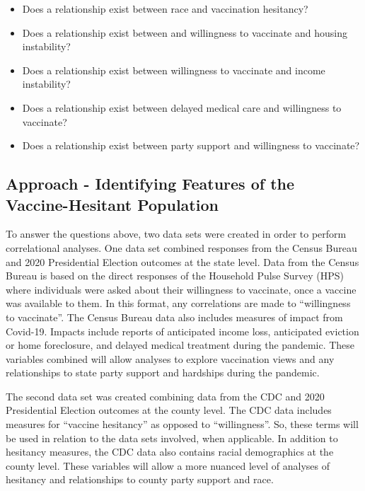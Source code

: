 \documentclass[
]{article}
\providecommand{\tightlist}{%
  \setlength{\itemsep}{0pt}\setlength{\parskip}{0pt}}
\begin{document}
\begin{itemize}
\tightlist
\item
  Does a relationship exist between race and vaccination hesitancy?
\item
  Does a relationship exist between and willingness to vaccinate and
  housing instability?
\item
  Does a relationship exist between willingness to vaccinate and income
  instability?
\item
  Does a relationship exist between delayed medical care and willingness
  to vaccinate?
\item
  Does a relationship exist between party support and willingness to
  vaccinate?
\end{itemize}

\hypertarget{approach---identifying-features-of-the-vaccine-hesitant-population}{%
\subsection{Approach - Identifying Features of the Vaccine-Hesitant
Population}\label{approach---identifying-features-of-the-vaccine-hesitant-population}}

To answer the questions above, two data sets were created in order to
perform correlational analyses. One data set combined responses from the
Census Bureau and 2020 Presidential Election outcomes at the state
level. Data from the Census Bureau is based on the direct responses of
the Household Pulse Survey (HPS) where individuals were asked about
their willingness to vaccinate, once a vaccine was available to them. In
this format, any correlations are made to ``willingness to vaccinate''.
The Census Bureau data also includes measures of impact from Covid-19.
Impacts include reports of anticipated income loss, anticipated eviction
or home foreclosure, and delayed medical treatment during the pandemic.
These variables combined will allow analyses to explore vaccination
views and any relationships to state party support and hardships during
the pandemic.

The second data set was created combining data from the CDC and 2020
Presidential Election outcomes at the county level. The CDC data
includes measures for ``vaccine hesitancy'' as opposed to
``willingness''. So, these terms will be used in relation to the data
sets involved, when applicable. In addition to hesitancy measures, the
CDC data also contains racial demographics at the county level. These
variables will allow a more nuanced level of analyses of hesitancy and
relationships to county party support and race.
\end{document}
